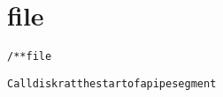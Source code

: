 \section{file}
\begin{shaded}
\begin{alltt}
/** file

  Call diskr at the start of a pipe segment

\end{alltt}
\end{shaded}
